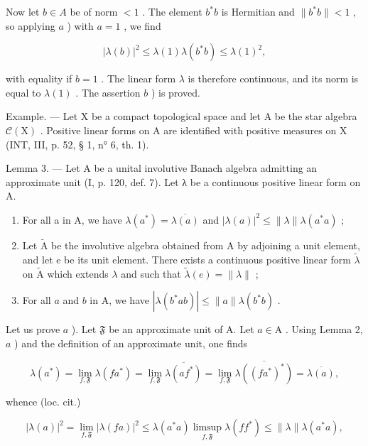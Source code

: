 Now let \(b \in A\) be of norm \(< 1\) . The element \(b^*b\) is Hermitian and \(\|b^*b\| < 1\) , so applying \(a\) ) with \(a = 1\) , we find

\[
| \lambda (b) | ^ {2} \leqslant \lambda (1) \lambda (b ^ {*} b) \leqslant \lambda (1) ^ {2},
\]

with equality if \(b = 1\) . The linear form \(\lambda\) is therefore continuous, and its norm is equal to \(\lambda(1)\) . The assertion \(b\) ) is proved.

Example. --- Let X be a compact topological space and let A be the star algebra \(\mathcal{C}(\mathrm{X})\) . Positive linear forms on A are identified with positive measures on X (INT, III, p. 52, § 1, n° 6, th. 1).

Lemma 3. --- Let A be a unital involutive Banach algebra admitting an approximate unit (I, p. 120, def. 7). Let λ be a continuous positive linear form on A.

\begin{enumerate}
\def\labelenumi{\alph{enumi})}
\item
  For all a in A, we have \(\lambda(a^{*})=\overline{\lambda(a)}\) and \(|\lambda(a)|^{2}\leqslant\|\lambda\|\lambda(a^{*}a)\) ;
\item
  Let \(\widetilde{\mathrm{A}}\) be the involutive algebra obtained from A by adjoining a unit element, and let e be its unit element. There exists a continuous positive linear form \(\widetilde{\lambda}\) on \(\widetilde{\mathrm{A}}\) which extends \(\lambda\) and such that \(\widetilde{\lambda}(e) = \|\lambda\|\) ;
\item
  For all \(a\) and \(b\) in A, we have \(|\lambda(b^{*}ab)|\leqslant\|a\|\lambda(b^{*}b)\) .
\end{enumerate}

Let us prove \(a\) ). Let \(\mathfrak{F}\) be an approximate unit of A. Let \(a \in \mathrm{A}\) . Using Lemma 2, \(a\) ) and the definition of an approximate unit, one finds

\[
\lambda (a ^ {*}) = \lim _ {f, \mathfrak {F}} \lambda (f a ^ {*}) = \lim _ {f, \mathfrak {F}} \overline {{\lambda (a f ^ {*})}} = \lim _ {f, \mathfrak {F}} \overline {{\lambda ((f a ^ {*}) ^ {*})}} = \overline {{\lambda (a)}},
\]

whence (loc. cit.)

\[
| \lambda (a) | ^ {2} = \lim _ {f, \mathfrak {F}} | \lambda (f a) | ^ {2} \leqslant \lambda (a ^ {*} a) \operatorname * {limsup} _ {f, \mathfrak {F}} \lambda (f f ^ {*}) \leqslant \| \lambda \| \lambda (a ^ {*} a),
\]

